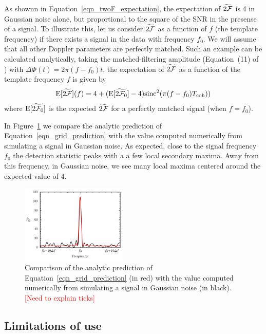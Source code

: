 \documentclass[aps, prd, twocolumn, superscriptaddress, floatfix, showpacs, nofootinbib, longbibliography]{revtex4-1}
\newcommand{\comment}[1]{\textcolor{red}{[#1]}}
\begin{document}
As shownn in Equation~\eqref{eqn_twoF_expectation}, the expectation of
$\widetilde{2{\mathcal{F}}}$ is 4 in Gaussian noise alone, but proportional to the square
of the SNR in the presense of a signal.  To illustrate this, let us consider
$\widetilde{2{\mathcal{F}}}$ as a function of $f$ (the template frequency) if there exists
a signal in the data with frequency $f_0$. We will assume that all other
Doppler parameters are perfectly matched.  Such an example can be calculated
analytically, taking the matched-filtering amplitude (Equation~(11) of
\citep{prix2005}) with $\Delta\Phi(t) = 2\pi(f - f_0) t$, the expectation of
$\widetilde{2{\mathcal{F}}}$ as a function of the template frequency $f$ is given by
\begin{equation}
\textrm{E}[\widetilde{2{\mathcal{F}}}](f) = 4 + 
(\textrm{E}[\widetilde{2{\mathcal{F}}_0}] -4)\textrm{sinc}^{2}(\pi(f-f_0)T_{\rm coh}))
\label{eqn_grid_prediction}
\end{equation}
where $\textrm{E}[\widetilde{2{\mathcal{F}}_0}]$ is the expected $\widetilde{2{\mathcal{F}}}$ for
a perfectly matched signal (when $f=f_0$).

In Figure~\ref{fig_grid_frequency} we compare the analytic prediction of
Equation~\eqref{eqn_grid_prediction} with the value computed numerically
from simulating a signal in Gaussian noise. As expected, close to the signal
frequency $f_0$ the detection statistic peaks with a a few local secondary
maxima. Away from this frequency, in Gaussian noise, we see many local maxima
centered around the expected value of 4.
\begin{figure}[htb]
\centering \includegraphics[width=0.45\textwidth]{grided_frequency_search_1D}
\caption{Comparison of the analytic prediction of
Equation~\eqref{eqn_grid_prediction} (in red) with the value computed
numerically from simulating a signal in Gaussian noise (in black).
\comment{Need to explain ticks}}
\label{fig_grid_frequency}
\end{figure}

\subsection{Limitations of use}
\end{document}
